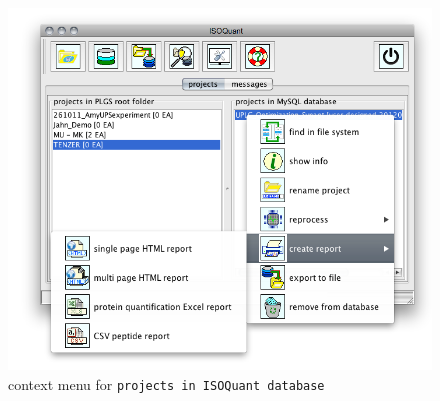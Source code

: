 \documentclass[]{article}
\makeatletter
\def\maxwidth{\ifdim\Gin@nat@width>\linewidth\linewidth
\else\Gin@nat@width\fi}
\let\Oldincludegraphics\includegraphics
\renewcommand{\includegraphics}[1]{\Oldincludegraphics[width=\maxwidth]{#1}}
\makeatother
\begin{document}
\begin{figure}[htbp]
\centering
\includegraphics{assets/isoquant/pics/db_context.png}
\caption{context menu for \lstinline!projects in ISOQuant database!
\label{pic:dbMenu}}
\end{figure}
\end{document}

